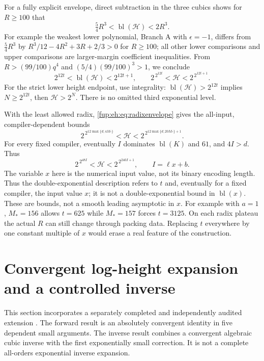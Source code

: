 \documentclass[11pt,letterpaper]{article}
\theoremstyle{definition}\newtheorem{definition}[theorem]{Definition}
\theoremstyle{remark}\newtheorem{remark}[theorem]{Remark}
\newcommand{\bl}{\operatorname{bl}}
\begin{document}
For a fully explicit envelope, direct subtraction in the three cubics
shows for $R\ge100$ that
\[
 \tfrac54R^3<\bl(\mathcal H)<2R^3.
\]
For example the weakest lower polynomial, Branch A with
$\epsilon=-1$, differs from $\tfrac54R^3$ by
$R^3/12-4R^2+3R+2/3>0$ for $R\ge100$; all other lower
comparisons and upper comparisons are larger-margin coefficient
inequalities. From $R>(99/100)q^4$ and
$(5/4)(99/100)^3>1$, we conclude
\begin{equation}\label{fup:eh:eq:tbound}
 2^{12t}<\bl(\mathcal H)<2^{12t+1},\qquad
 2^{\,2^{12t}}<\mathcal H<2^{\,2^{12t+1}}.
\end{equation}
For the strict lower height endpoint, use integrality:
$\bl(\mathcal H)>2^{12t}$ implies $N\ge2^{12t}$, then
$\mathcal H>2^N$. There is no omitted third exponential level.

With the least allowed radix, \eqref{fup:eh:eq:radixenvelope} gives the
all-input, compiler-dependent bounds
\begin{equation}\label{fup:eh:eq:globalinput}
 2^{\,2^{12\max\{d,4M_*\}}}<\mathcal H
 <2^{\,2^{12\max\{d,20M_*\}+1}}.
\end{equation}
For every fixed compiler, eventually $I$ dominates $\bl(K)$ and $61$,
and $4I>d$. Thus
\begin{equation}\label{fup:eh:eq:eventualinput}
 2^{\,2^{48I}}<\mathcal H<2^{\,2^{240I+1}},\qquad I=\ell x+b.
\end{equation}
The variable $x$ here is the numerical input value, not its binary
encoding length. Thus the double-exponential description refers to $t$
and, eventually for a fixed compiler, the input value $x$; it is not a
double-exponential bound in $\bl(x)$.
These are bounds, not a smooth leading asymptotic in $x$. For example
with $a=1$, $M_*=156$ allows $t=625$ while $M_*=157$ forces
$t=3125$. On each radix plateau the actual $R$ can still change through
packing data. Replacing $t$ everywhere by one constant multiple of $x$
would erase a real feature of the construction.

\section{Convergent log-height expansion and a controlled inverse}
\label{fup:eh:sec:expansion}
This section incorporates a separately completed and independently
audited extension \cite{fup:eh:expansion,fup:eh:expansionaudit}. The forward result
is an absolutely convergent identity in five dependent small arguments.
The inverse result combines a convergent algebraic cubic inverse with
the first exponentially small correction. It is not a complete
all-orders exponential inverse expansion.
\end{document}
